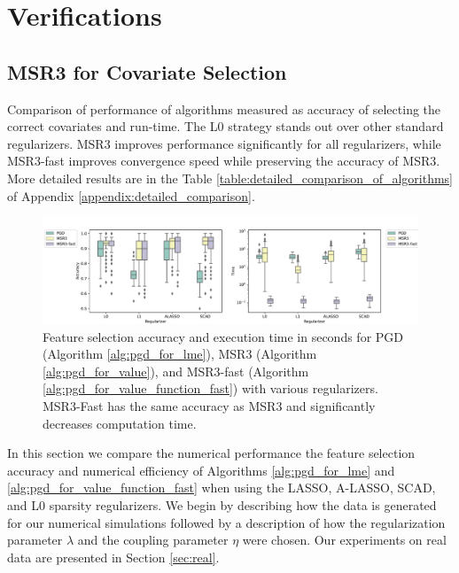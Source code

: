 \section{Verifications}
\label{sec:applications}

\subsection{MSR3 for Covariate Selection}
\label{ch:sr3_l1}

\begin{table}
\centering

\caption{\label{table:comparison_of_algorithms} Comparison of performance of algorithms measured as accuracy of selecting the correct covariates and run-time. The L0 strategy stands out 
over other standard regularizers. MSR3 improves performance significantly for all regularizers, while MSR3-fast improves convergence speed while preserving the 
accuracy of MSR3.  
More detailed results are in the Table \ref{table:detailed_comparison_of_algorithms} of Appendix \ref{appendix:detailed_comparison}.}
\end{table}

\begin{figure}
    \centering
	\includegraphics[width=1.0\textwidth]{figures/performance_picture_current}
	\caption{\label{fig:box_with_whiskers_for_synthetic_data}	Feature selection accuracy and execution time in seconds for PGD 
	(Algorithm \ref{alg:pgd_for_lme}), 
	MSR3 (Algorithm \ref{alg:pgd_for_value}), and MSR3-fast
	(Algorithm \ref{alg:pgd_for_value_function_fast}) with various regularizers. 
	MSR3-Fast has the same accuracy as 
	MSR3 and significantly decreases computation time.}
\end{figure}

In this section we 
{compare the numerical performance 
the feature selection accuracy and numerical efficiency of Algorithms 
\ref{alg:pgd_for_lme} and 
\ref{alg:pgd_for_value_function_fast} when using the 
LASSO, A-LASSO, SCAD, and L0 sparsity regularizers.
We begin by describing how the data is generated for our numerical simulations 
followed by a description of how the  
regularization parameter $\lambda$ and the coupling parameter $\eta$  were chosen.
Our experiments on real data are presented in Section \ref{sec:real}.}

